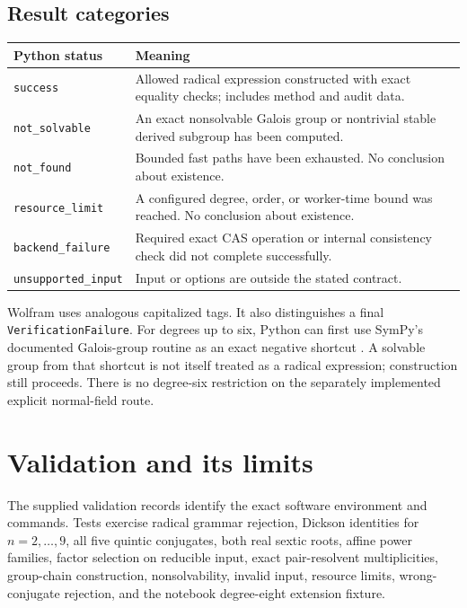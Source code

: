 \documentclass[11pt,a4paper]{article}
\newcommand{\code}[1]{\texttt{\small #1}}
\theoremstyle{definition}
\begin{document}
\subsection{Result categories}
\begin{center}
\begin{tabular}{@{}p{}p{}@{}}
\toprule
Python status & Meaning\\
\midrule
\code{success} & Allowed radical expression constructed with exact equality
checks; includes method and audit data.\\[3pt]
\code{not\_solvable} & An exact nonsolvable Galois group or nontrivial stable
derived subgroup has been computed.\\[3pt]
\code{not\_found} & Bounded fast paths have been exhausted. No conclusion about
existence.\\[3pt]
\code{resource\_limit} & A configured degree, order, or worker-time bound was
reached. No conclusion about existence.\\[3pt]
\code{backend\_failure} & Required exact CAS operation or internal consistency
check did not complete successfully.\\[3pt]
\code{unsupported\_input} & Input or options are outside the stated contract.\\
\bottomrule
\end{tabular}
\end{center}
Wolfram uses analogous capitalized tags. It also distinguishes a final
\code{VerificationFailure}. For degrees up to six, Python can first
use SymPy's documented Galois-group routine as an exact negative shortcut
\cite{sympyfields}. A solvable group from that shortcut is not itself treated
as a radical expression; construction still proceeds. There is no degree-six
restriction on the separately implemented explicit normal-field route.

\section{Validation and its limits}\label{sec:validation}
The supplied validation records identify the exact software environment and
commands. Tests exercise radical grammar rejection, Dickson identities for
$n=2,\ldots,9$, all five quintic conjugates, both real sextic roots, affine
power families, factor selection on reducible input, exact pair-resolvent
multiplicities, group-chain construction, nonsolvability, invalid input,
resource limits, wrong-conjugate rejection, and the notebook degree-eight
extension fixture.
\end{document}
